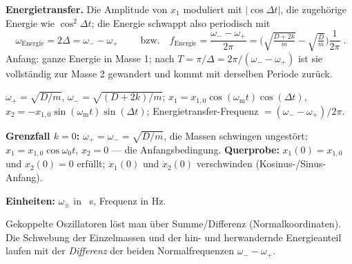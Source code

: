 \textbf{Energietransfer.} Die Amplitude von $x_1$ moduliert mit
$|\cos\Delta t|$, die zugehörige Energie wie $\cos^2\Delta t$; die Energie
schwappt also periodisch mit
\begin{equation}
  \boxed{\;\omega_{\text{Energie}}=2\Delta=\omega_- -\omega_+\;}
  \qquad\text{bzw.}\quad
  f_{\text{Energie}}=\frac{\omega_--\omega_+}{2\pi}
  =\Big(\sqrt{\tfrac{D+2k}{m}}-\sqrt{\tfrac{D}{m}}\Big)\frac1{2\pi}\;.
\end{equation}
Anfang: ganze Energie in Masse 1; nach $T=\pi/\Delta=2\pi/(\omega_--\omega_+)$
ist sie vollständig zur Masse 2 gewandert und kommt mit derselben Periode
zurück.

\begin{ergebnis}
$\omega_+=\sqrt{D/m}$, $\omega_-=\sqrt{(D+2k)/m}$;
$x_1=x_{1,0}\cos(\omega_{\mathrm m}t)\cos(\Delta t)$,
$x_2=-x_{1,0}\sin(\omega_{\mathrm m}t)\sin(\Delta t)$;
Energietransfer-Frequenz $=(\omega_--\omega_+)/2\pi$.
\end{ergebnis}

\begin{kontrolle}
\textbf{Grenzfall $k=0$:} $\omega_+=\omega_-=\sqrt{D/m}$, die Massen schwingen
ungestört; $x_1=x_{1,0}\cos\omega_0t$, $x_2=0$ --- die Anfangsbedingung.
\textbf{Querprobe:} $x_1(0)=x_{1,0}$ und $x_2(0)=0$ erfüllt; $\dot x_1(0)$ und
$\dot x_2(0)$ verschwinden (Kosinus-/Sinus-Anfang). \checkmark

\textbf{Einheiten:} $\omega_\pm$ in \unit{\per\second}, Frequenz in
\unit{\hertz}. \checkmark
\end{kontrolle}

\begin{merksatz}
Gekoppelte Oszillatoren löst man über Summe/Differenz (Normalkoordinaten). Die
Schwebung der Einzelmassen und der hin- und herwandernde Energieanteil
laufen mit der \emph{Differenz} der beiden Normalfrequenzen $\omega_--\omega_+$.
\end{merksatz}
